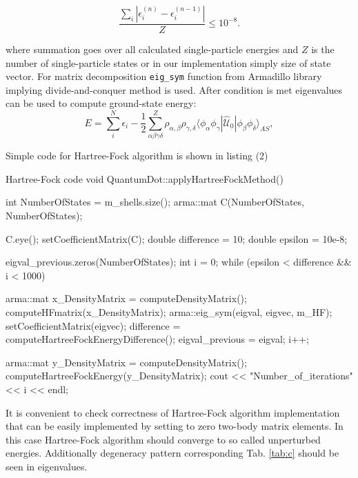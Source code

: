 \documentclass[10pt]{article}
\newcommand*{\hatU}{\hat{\mathcal{U}}}
\newcommand{\code}[1]{\colorbox{coding}{\texttt{#1}}}
\begin{document}
\begin{equation}
\frac{\sum_{i}|\epsilon_{i}^{(n)} - \epsilon_{i}^{(n-1)}|}{Z} \le 10^{-8}. \label{eq:diag-cond}
\end{equation}

where summation goes over all calculated single-particle energies and $Z$ is the number of single-particle states or in our implementation simply size of state vector.
For matrix decomposition \code{eig_sym} function from Armadillo library implying divide-and-conquer method is used.
After condition \label{eq:diag-cond} is met eigenvalues can be used to compute ground-state energy: 
\begin{equation} \label{final_energy}
E = \sum^N_i \epsilon_i - \frac{1}{2}\sum_{\alpha\beta\gamma\delta}^Z \rho_{\alpha,\beta} \rho_{\gamma,\delta}\langle \phi_{\alpha}\phi_{\gamma}|\hatU_{0}|\phi_{\beta}\phi_{\delta}\rangle_{AS},
\end{equation}







Simple code for Hartree-Fock algorithm is shown in listing (2)
\begin{pseudolisting}{Hartree-Fock code}
void QuantumDot::applyHartreeFockMethod(){
    int NumberOfStates = m_shells.size();
    arma::mat C(NumberOfStates, NumberOfStates);

    C.eye();
    setCoefficientMatrix(C);
    double difference = 10;
    double epsilon = 10e-8;

    eigval_previous.zeros(NumberOfStates);
    int i = 0;
    while (epsilon < difference && i < 1000){
        arma::mat x_DensityMatrix = computeDensityMatrix();
        computeHFmatrix(x_DensityMatrix);
        arma::eig_sym(eigval, eigvec, m_HF);
        setCoefficientMatrix(eigvec);
        difference = computeHartreeFockEnergyDifference();
        eigval_previous = eigval;
        i++;

    }

    arma::mat y_DensityMatrix = computeDensityMatrix();
    computeHartreeFockEnergy(y_DensityMatrix);
    cout << "Number_of_iterations" << i << endl;
}
\end{pseudolisting}

It is convenient to check correctness of Hartree-Fock algorithm implementation that can be easily implemented by setting to zero two-body matrix elements. In this case Hartree-Fock algorithm should converge to so called unperturbed energies. Additionally degeneracy pattern corresponding Tab. \ref{tab:c} should be seen in eigenvalues.
\end{document}
